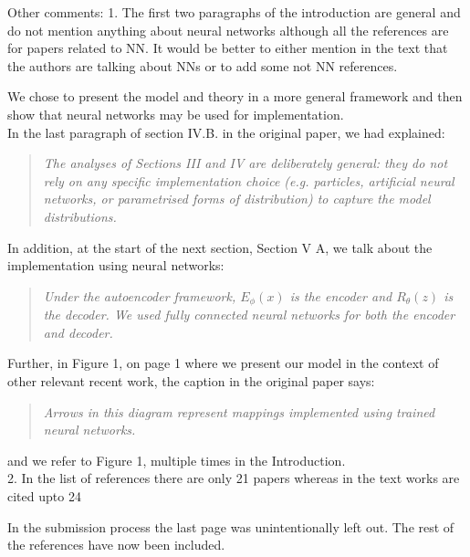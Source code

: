 \documentclass[a4paper,11pt]{article}
\begin{document}
Other comments: \newline
{\color{blue}
1. The first two paragraphs of the introduction are general and do not mention anything about neural networks although all the references are for papers related to NN. It would be better to either mention in the text that the authors are talking about NNs or to add some not NN references.}\newline

We chose to present the model and theory in a more general framework and then show that neural networks may be used for implementation.\\
    
In the last paragraph of section IV.B. in the original paper, we had explained:
    \begin{quote}
    {\it The analyses of Sections III and IV are deliberately general: they do not rely on any specific implementation choice (e.g. particles, artificial neural networks, or parametrised forms of distribution) to capture the model distributions.}
    \end{quote}

In addition, at the start of the next section, Section V A, we talk about the implementation using neural networks:\\
\begin{quote}
    {\it Under the autoencoder framework, $E_\phi(x)$ is the encoder and $R_\theta(z)$ is the decoder. We used fully connected neural networks for both the encoder and decoder.}
\end{quote}

Further, in Figure 1, on page 1 where we present our model in the context of other relevant recent work, the caption in the original paper says:

\begin{quote}
    {\it Arrows in this diagram represent mappings implemented using trained neural networks.}
\end{quote}

and we refer to Figure 1, multiple times in the Introduction. \\

{\color{blue}
2. In the list of references there are only 21 papers whereas in the text works are cited upto 24} \newline

In the submission process the last page was unintentionally left out. The rest of the references have now been included. \newline
\end{document}
